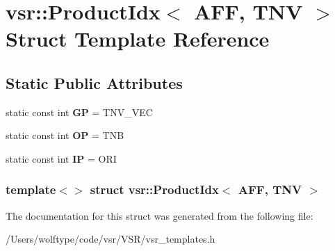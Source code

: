 \hypertarget{structvsr_1_1_product_idx_3_01_a_f_f_00_01_t_n_v_01_4}{\section{vsr\-:\-:Product\-Idx$<$ A\-F\-F, T\-N\-V $>$ Struct Template Reference}
\label{structvsr_1_1_product_idx_3_01_a_f_f_00_01_t_n_v_01_4}
}
\subsection*{Static Public Attributes}
\begin{DoxyCompactItemize}
\item 
\hypertarget{structvsr_1_1_product_idx_3_01_a_f_f_00_01_t_n_v_01_4_affb0aaa8d2fcbb2558055a278a7ea86c}{static const int {\bfseries G\-P} = T\-N\-V\-\_\-\-V\-E\-C}\label{structvsr_1_1_product_idx_3_01_a_f_f_00_01_t_n_v_01_4_affb0aaa8d2fcbb2558055a278a7ea86c}

\item 
\hypertarget{structvsr_1_1_product_idx_3_01_a_f_f_00_01_t_n_v_01_4_ae4fa4ae79253ac502cec3c0d5e8eb2d1}{static const int {\bfseries O\-P} = T\-N\-B}\label{structvsr_1_1_product_idx_3_01_a_f_f_00_01_t_n_v_01_4_ae4fa4ae79253ac502cec3c0d5e8eb2d1}

\item 
\hypertarget{structvsr_1_1_product_idx_3_01_a_f_f_00_01_t_n_v_01_4_a3602afe7b74f432e4f94bc0912ae4e62}{static const int {\bfseries I\-P} = O\-R\-I}\label{structvsr_1_1_product_idx_3_01_a_f_f_00_01_t_n_v_01_4_a3602afe7b74f432e4f94bc0912ae4e62}

\end{DoxyCompactItemize}
\subsubsection*{template$<$$>$ struct vsr\-::\-Product\-Idx$<$ A\-F\-F, T\-N\-V $>$}



The documentation for this struct was generated from the following file\-:\begin{DoxyCompactItemize}
\item 
/\-Users/wolftype/code/vsr/\-V\-S\-R/vsr\-\_\-templates.\-h\end{DoxyCompactItemize}
